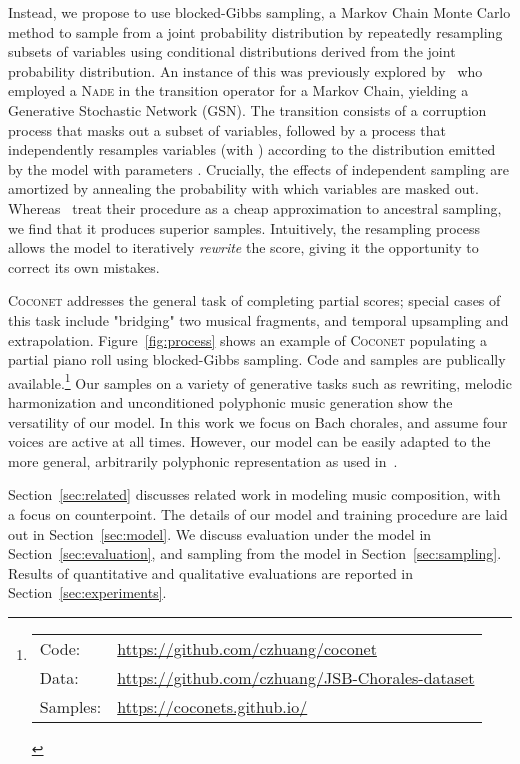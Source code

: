 \documentclass{article}
\newcommand{\coconet}{\textsc{Coconet}\xspace}
\newcommand{\nade}{\textsc{Nade}\xspace}
\begin{document}
Instead, we propose to use blocked-Gibbs sampling, a Markov Chain Monte Carlo method to sample from a joint probability distribution by repeatedly resampling subsets of variables using conditional distributions derived from the joint probability distribution.
An instance of this was previously explored by~\cite{yao2014equivalence} who employed a \nade in the transition operator for a Markov Chain, yielding a Generative Stochastic Network (GSN).
The transition consists of a corruption process that masks out a subset  of variables,
followed by a process that independently resamples variables  (with ) according to the distribution  emitted by the model with parameters .
Crucially, the effects of independent sampling are amortized by annealing the probability with which variables are masked out.
Whereas~\cite{yao2014equivalence} treat their procedure as a cheap approximation to ancestral sampling,
we find that it produces superior samples.
Intuitively, the resampling process allows the model to iteratively \emph{rewrite} the score, giving it the opportunity to correct its own mistakes.

\coconet addresses the general task of completing partial scores; special cases of this task include "bridging" two musical fragments, and temporal upsampling and extrapolation.
Figure~\ref{fig:process} shows an example of \coconet populating a partial piano roll using blocked-Gibbs sampling. Code and samples are publically available.\footnote{\begin{tabular}{ l l }
   Code:& \tiny \url{https://github.com/czhuang/coconet} \\
   Data:&  \tiny \url{https://github.com/czhuang/JSB-Chorales-dataset} \\
  Samples:& \tiny \url{https://coconets.github.io/} \\

\end{tabular}
}
Our samples on a variety of generative tasks such as rewriting, melodic harmonization and unconditioned polyphonic music generation show the versatility of our model.
In this work we focus on Bach chorales, and assume four voices are active at all times.
However, our model can be easily adapted to the more general, arbitrarily polyphonic representation as used in~\cite{boulanger2012modeling}.





Section~\ref{sec:related} discusses related work in modeling music composition, with a focus on counterpoint.
The details of our model and training procedure are laid out in Section~\ref{sec:model}.
We discuss evaluation under the model in Section~\ref{sec:evaluation}, and sampling from the model in Section~\ref{sec:sampling}.
Results of quantitative and qualitative evaluations are reported in Section~\ref{sec:experiments}.  
\end{document}
